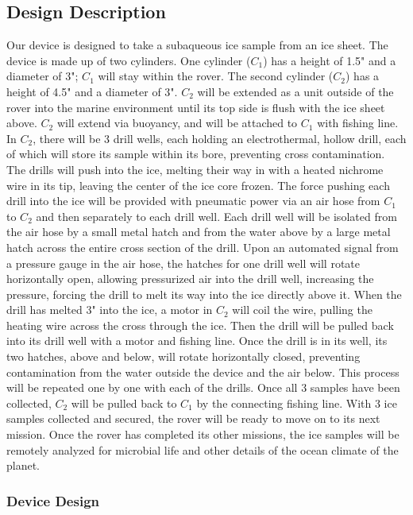 \documentclass{article}
\begin{document}
\subsection{Design Description}
Our device is designed to take a subaqueous ice sample from an ice sheet. The device is made up of two cylinders. One cylinder ($C_1$) has a height of 1.5" and a diameter of 3"; $C_1$ will stay within the rover. The second cylinder ($C_2$) has a height of 4.5" and a diameter of 3". $C_2$ will be extended as a unit outside of the rover into the marine environment until its top side is flush with the ice sheet above. $C_2$ will extend via buoyancy, and will be attached to $C_1$ with fishing line. In $C_2$, there will be 3 drill wells, each holding an electrothermal, hollow drill, each of which will store its sample within its bore, preventing cross contamination. The drills will push into the ice, melting their way in with a heated nichrome wire in its tip, leaving the center of the ice core frozen. The force pushing each drill into the ice will be provided with pneumatic power via an air hose from $C_1$ to $C_2$ and then separately to each drill well. Each drill well will be isolated from the air hose by a small metal hatch and from the water above by a large metal hatch across the entire cross section of the drill. Upon an automated signal from a pressure gauge in the air hose, the hatches for one drill well will rotate horizontally open, allowing pressurized air into the drill well, increasing the pressure, forcing the drill to melt its way into the ice directly above it. When the drill has melted 3" into the ice, a motor in $C_2$ will coil the wire, pulling the heating wire across the cross through the ice. Then the drill will be pulled back into its drill well with a motor and fishing line. Once the drill is in its well, its two hatches, above and below, will rotate horizontally closed, preventing contamination from the water outside the device and the air below. This process will be repeated one by one with each of the drills. Once all 3 samples have been collected, $C_2$ will be pulled back to $C_1$ by the connecting fishing line. With 3 ice samples collected and secured, the rover will be ready to move on to its next mission. Once the rover has completed its other missions, the ice samples will be remotely analyzed for microbial life and other details of the ocean climate of the planet.

\subsubsection{Device Design}
\end{document}
